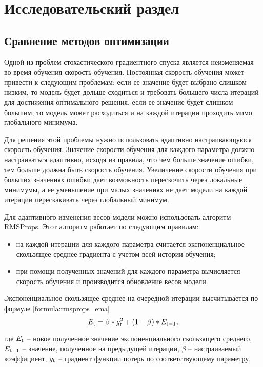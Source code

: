 \chapter{Исследовательский раздел}

\section{Сравнение методов оптимизации}

Одной из проблем стохастического градиентного спуска является неизменяемая во время обучения скорость обучения. Постоянная скорость обучения может привести к следующим проблемам: если ее значение будет выбрано слишком низким, то модель будет дольше сходиться и требовать большего числа итераций для достижения оптимального решения, если ее значение будет слишком большим, то модель может расходиться и на каждой итерации проходить мимо глобального минимума.

Для решения этой проблемы нужно использовать адаптивно настраивающуюся скорость обучения. Значение скорости обучения для каждого параметра должно настраиваться адаптивно, исходя из правила, что чем больше значение ошибки, тем больше должна быть скорость обучения. Увеличение скорости обучения при больших значениях ошибки дает возможность перескочить через локальные минимумы, а ее уменьшение при малых значениях не дает модели на каждой итерации перескакивать через глобальный минимум.

Для адаптивного изменения весов модели можно использовать алгоритм RMSProps. Этот алгоритм работает по следующим правилам:
\begin{itemize}
	\item на каждой итерации для каждого параметра считается экспоненциальное скользящее среднее градиента с учетом всей истории обучения;
	\item при помощи полученных значений для каждого параметра вычисляется скорость обучения и производится обновление весов модели.
\end{itemize}

Экспоненциальное скользящее среднее на очередной итерации высчитывается по формуле \ref{formula:rmsprops_ema}
\begin{equation}\label{formula:rmsprops_ema}
E_{\rm{t}} = \beta * g_{\rm{t}}^2 + (1 - \beta) * E_{\rm{t-1}},
\end{equation}

где $E_{\rm{t}}$ -- новое полученное значение экспоненциального скользящего среднего, $E_{\rm{t-1}}$ -- значение, полученное на предыдущей итерации, $\beta$ -- настраиваемый коэффициент, $g_{\rm{t}}$ -- градиент функции потерь по соответствующему параметру.

